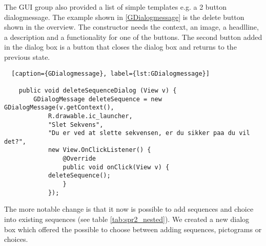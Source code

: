 The GUI group also provided a list of simple templates e.g. a 2 button dialogmessage. The example shown in \ref{GDialogmessage} is the delete button shown in the overview. The constructor needs the context, an image, a headlline, a description and a functionality for one of the buttons. The second button added in the dialog box is a button that closes the dialog box and returns to the previous state.

\begin{lstlisting}  [caption={GDialogmessage}, label={lst:GDialogmessage}]

    public void deleteSequenceDialog (View v) {
        GDialogMessage deleteSequence = new GDialogMessage(v.getContext(),
            R.drawable.ic_launcher,
            "Slet Sekvens",
            "Du er ved at slette sekvensen, er du sikker paa du vil det?",
            new View.OnClickListener() {
                @Override
                public void onClick(View v) {
			deleteSequence();
                }
            });

\end{lstlisting}

The more notable change is that it now is possible to add sequences and choice into existing sequences (see table \ref{tab:spr2_nested}). We created a new dialog box which offered the possible to choose between adding sequences, pictograms or choices. 